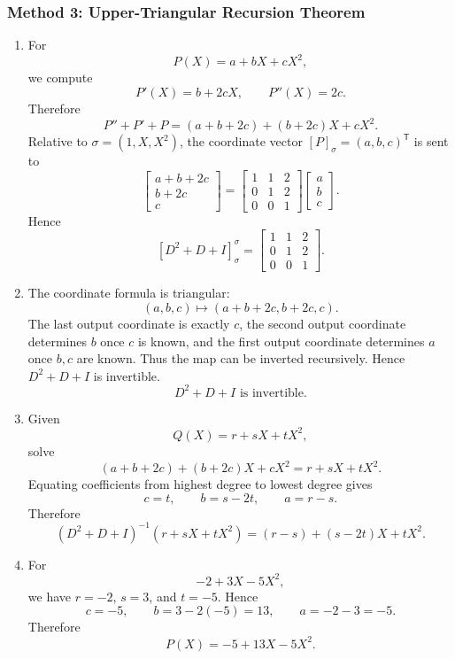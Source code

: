 \documentclass[12pt]{article}
\newcommand{\T}{\mathsf{T}}
\begin{document}
\newpage
\subsubsection{Method 3: Upper-Triangular Recursion Theorem}
\begin{enumerate}[label=(\alph*)]
  \item For
  \[
    P(X)=a+bX+cX^2,
  \]
  we compute
  \[
    P'(X)=b+2cX,
    \qquad
    P''(X)=2c.
  \]
  Therefore
  \[
    P''+P'+P=(a+b+2c)+(b+2c)X+cX^2.
  \]
  Relative to $\sigma=(1,X,X^2)$, the coordinate vector $[P]_{\sigma}=(a,b,c)^\T$ is sent to
  \[
    \begin{bmatrix}
      a+b+2c\\
      b+2c\\
      c
    \end{bmatrix}
    =
    \begin{bmatrix}
      1&1&2\\
      0&1&2\\
      0&0&1
    \end{bmatrix}
    \begin{bmatrix}
      a\\b\\c
    \end{bmatrix}.
  \]
  Hence
  \[
    \boxed{[D^2+D+I]_{\sigma}^{\sigma}
    =
    \begin{bmatrix}
      1&1&2\\
      0&1&2\\
      0&0&1
    \end{bmatrix}.}
  \]

  \item The coordinate formula is triangular:
  \[
    (a,b,c)\mapsto (a+b+2c,b+2c,c).
  \]
  The last output coordinate is exactly $c$, the second output coordinate determines $b$ once $c$ is known, and the first output coordinate determines $a$ once $b,c$ are known. Thus the map can be inverted recursively. Hence $D^2+D+I$ is invertible.
  \[
    \boxed{D^2+D+I\text{ is invertible}.}
  \]

  \item Given
  \[
    Q(X)=r+sX+tX^2,
  \]
  solve
  \[
    (a+b+2c)+(b+2c)X+cX^2=r+sX+tX^2.
  \]
  Equating coefficients from highest degree to lowest degree gives
  \[
    c=t,
    \qquad
    b=s-2t,
    \qquad
    a=r-s.
  \]
  Therefore
  \[
    \boxed{(D^2+D+I)^{-1}(r+sX+tX^2)=(r-s)+(s-2t)X+tX^2.}
  \]

  \item For
  \[
    -2+3X-5X^2,
  \]
  we have $r=-2$, $s=3$, and $t=-5$. Hence
  \[
    c=-5,
    \qquad
    b=3-2(-5)=13,
    \qquad
    a=-2-3=-5.
  \]
  Therefore
  \[
    \boxed{P(X)=-5+13X-5X^2.}
  \]
\end{enumerate}
\end{document}
